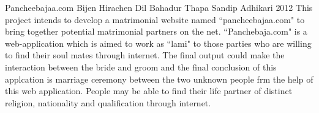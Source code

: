  \begin{conf-abstract}[]
{Pancheebajaa.com}
{
Bijen Hirachen
Dil Bahadur Thapa
Sandip Adhikari
}
{2012}
	This project intends to develop a matrimonial website named ``pancheebajaa.com" to bring together
potential matrimonial partners on the net. ``Panchebaja.com" is a web-application which is aimed to work
as ``lami" to those parties who are willing to find their soul mates through internet. The final output 
could make the interaction between the bride and groom and the final conclusion of this applcation is marriage
ceremony between the two unknown people frm the help of this web application. People may be able to find their
life partner of distinct religion, nationality and qualification through internet.
  \end{conf-abstract}